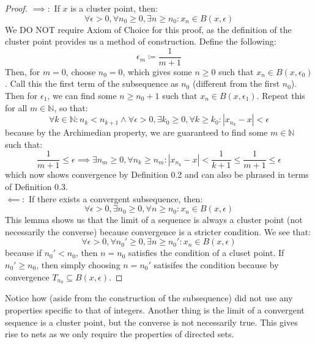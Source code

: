 \documentclass[10pt,letterpaper]{article} %
\begin{document}
\begin{proof}
$\implies:$ If $x$ is a cluster point, then:
\begin{equation*}
\forall \epsilon > 0, \forall n_0 \geqslant 0, \exists n \geqslant n_0: x_n \in B(x, \epsilon)
\end{equation*}
We DO NOT require Axiom of Choice for this proof, as the definition of the cluster point provides us a method of construction. Define the following:
\begin{equation*}
\epsilon_{m} \coloneq \frac{1}{m+1}
\end{equation*}
Then, for $m = 0$, choose $n_0 = 0$, which gives some $n \geqslant 0$ such that $x_n \in B(x, \epsilon_0)$. Call this the first term of the subsequence as $n_0$ (different from the first $n_0$). \\

Then for $\epsilon_1$, we can find some $n \geqslant n_0 + 1$ such that $x_n \in B(x, \epsilon_1)$. Repeat this for all $m \in \mathbb{N}$, so that:
\begin{equation*}
\forall k \in \mathbb{N}: n_k < n_{k+1} \land \forall \epsilon > 0, \exists k_0 \geqslant 0, \forall k \geqslant k_0: |x_{n_k} - x| < \epsilon
\end{equation*}
because by the Archimedian property, we are guaranteed to find some $m \in \mathbb{N}$ such that:
\begin{equation*}
\frac{1}{m+1} \leqslant \epsilon \implies \exists n_m \geqslant 0, \forall n_k \geqslant n_m: |x_{n_k} - x| < \frac{1}{k+1} \leqslant \frac{1}{m+1} \leqslant \epsilon
\end{equation*}
which now shows convergence by Definition 0.2 and can also be phrased in terms of Definition 0.3.\\

$\impliedby:$ If there exists a convergent subsequence, then:
\begin{equation*}
\forall \epsilon > 0, \exists n_0 \geqslant 0, \forall n \geqslant n_0: x_n \in B(x, \epsilon)
\end{equation*}
This lemma shows us that the limit of a sequence is always a cluster point (not necessarily the converse) because convergence is a stricter condition. We see that:
\begin{equation*}
\forall \epsilon > 0, \forall n_0' \geqslant 0, \exists n \geqslant n_0': x_n \in B(x, \epsilon)
\end{equation*}
because if $n_0' < n_0$, then $n = n_0$ satisfies the condition of a cluset point. If $n_0' \geqslant n_0$, then simply choosing $n = n_0'$ satisifes the condition because by convergence $T_{n_0} \subseteq B(x, \epsilon)$. 
\end{proof}
Notice how (aside from the construction of the subsequence) did not use any properties specific to that of integers. Another thing is the limit of a convergent sequence is a cluster point, but the converse is not necessarily true. This gives rise to nets as we only require the properties of directed sets.
\end{document}
